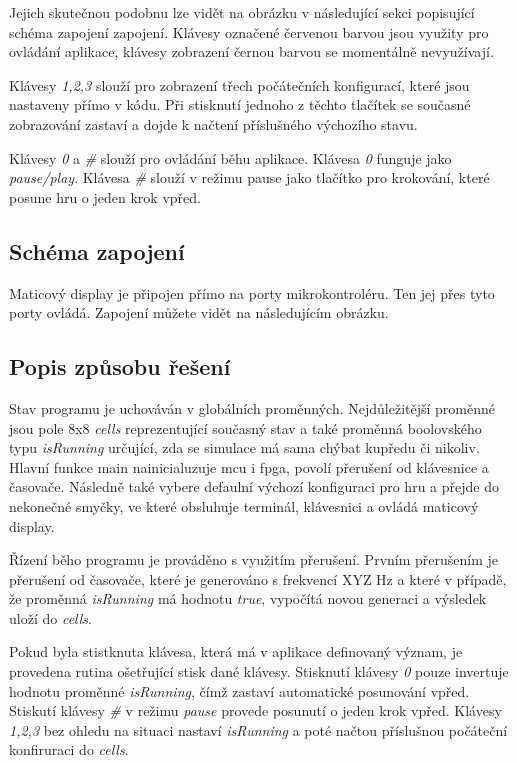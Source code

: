 \documentclass[12pt,a4paper,titlepage]{article}
\begin{document}
Jejich skutečnou podobnu lze vidět na obrázku v následující sekci popisující schéma zapojení zapojení. Klávesy označené červenou barvou jsou využity pro ovládání aplikace, klávesy zobrazení černou barvou se momentálně nevyužívají. 

Klávesy \textit{1,2,3} slouží pro zobrazení třech počátečních konfigurací, které jsou nastaveny přímo v kódu. Při stisknutí jednoho z těchto tlačítek se současné zobrazování zastaví a dojde k načtení příslušného výchozího stavu. 

Klávesy \textit{0} a \textit{\#} slouží pro ovládání běhu aplikace. Klávesa \textit{0} funguje jako \textit{pause/play}. Klávesa \textit{\#} slouží v režimu pause jako tlačítko pro krokování, které posune hru o jeden krok vpřed.

\subsection{Schéma zapojení}
Maticový display je připojen přímo na porty mikrokontroléru. Ten jej přes tyto porty ovládá. Zapojení můžete vidět na následujícím obrázku.

\subsection{Popis způsobu řešení}
Stav programu je uchováván v globálních proměnných. Nejdůležitější proměnné jsou pole 8x8 \textit{cells} reprezentující současný stav a také proměnná boolovského typu \textit{isRunning} určující, zda se simulace má sama chýbat kupředu či nikoliv. Hlavní funkce main nainicialuzuje mcu i fpga, povolí přerušení od klávesnice a časovače. Následně také vybere defaulní výchozí konfiguraci pro hru a přejde do nekonečné smyčky, ve které obsluhuje terminál, klávesnici a ovládá maticový display.

Řízení běho programu je prováděno s využitím přerušení. Prvním přerušením je přerušení od časovače, které je generováno s frekvencí XYZ Hz a které v případě, že proměnná \textit{isRunning} má hodnotu \textit{true}, vypočítá novou generaci a výsledek uloží do \textit{cells}. 


Pokud byla stistknuta klávesa, která má v aplikace definovaný význam, je provedena rutina ošetřující stisk dané klávesy.
Stisknutí klávesy \textit{0} pouze invertuje hodnotu proměnné \textit{isRunning}, čímž zastaví automatické posunování vpřed. Stiskutí klávesy \textit{\#} v režimu \textit{pause} provede posunutí o jeden krok vpřed. Klávesy \textit{1,2,3} bez ohledu na situaci nastaví \textit{isRunning} a poté načtou příslušnou počáteční konfiruraci do \textit{cells}.
\end{document}
